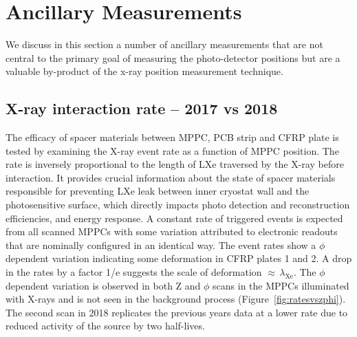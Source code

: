 \section{Ancillary Measurements}

We discuss in this section a number of ancillary measurements that are not central to the primary goal of measuring the photo-detector positions but are a valuable by-product of the x-ray position measurement technique. 

\subsection { X-ray interaction rate -- 2017 vs 2018}  
The efficacy of spacer materials between MPPC, PCB strip and CFRP
plate is tested by examining the X-ray event rate as a function of
MPPC position. The rate is inversely proportional to the length of LXe
traversed by the X-ray before interaction.  It provides crucial
information about the state of spacer materials responsible for
preventing LXe leak between inner cryostat wall and the photosensitive
surface, which directly impacts photo detection and reconstruction
efficiencies, and energy response.  A constant rate of triggered
events is expected from all scanned MPPCs with some variation
attributed to electronic readouts that are nominally configured in an
identical way.  The event rates show a $\phi$ dependent variation
indicating some deformation in CFRP plates 1 and 2.  A drop in the
rates by a factor 1/e suggests the scale of deformation
$\approx\,\lambda_{\mathrm{Xe}}$.  The $\phi$ dependent variation is
observed in both Z and $\phi$ scans in the MPPCs illuminated with
X-rays and is not seen in the background process
(Figure~\ref{fig:ratesvszphi}).  The second scan in 2018 replicates
the previous years data at a lower rate due to reduced activity of the
source by two half-lives.  
